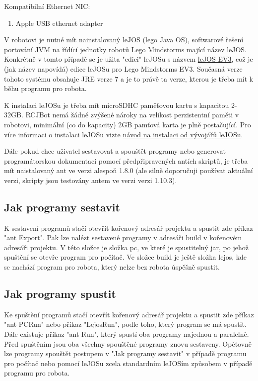\documentclass[12pt, ngerman]{article}
\begin{document}
Kompatibilní Ethernet NIC:
\begin{enumerate}[leftmargin=5mm]
\item Apple USB ethernet adapter
\end{enumerate}

V robotovi je nutné mít nainstalovaný leJOS (lego Java OS), softwarové řešení portování JVM na řídící jednotky robotů Lego Mindstorms mající název leJOS. Konkrétně v tomto případě se je užita "edici" leJOSu s názvem \href{http://www.lejos.org/ev3.php}{leJOS EV3}, což je (jak název napovídá) edice leJOSu pro Lego Mindstorms EV3. Současná verze tohoto systému obsahuje JRE verze 7 a je to právě ta verze, kterou je třeba mít k běhu programu pro robota.

K instalaci leJOSu je třeba mít microSDHC paměťovou kartu s kapacitou 2-32GB. RCJBot nemá žádné zvýšené nároky na velikost perzistentní paměti v robotovi, minimální (co do kapacity) 2GB pamťová karta je plně postačující. Pro více informaci o instalaci leJOSu vizte \href{https://sourceforge.net/p/lejos/wiki/Windows Installation/}{návod na instalaci od vývojářů leJOSu}.

Dále pokud chce uživatel sestavovat a spouštět programy nebo generovat programátorskou dokumentaci pomocí předpřipravených antích skriptů, je třeba mít naistalovaný ant ve verzi alespoň 1.8.0 (ale silně doporučuji používat aktuální verzi, skripty jsou testovány antem ve verzi verzi 1.10.3).

\subsection{Jak programy sestavit}
K sestavení programů stačí otevřít kořenový adresář projektu a spustit zde příkaz "ant Export". Pak lze nalézt sestavené programy v adresáři build v kořenovém adresáři projektu. V této složce je složka pc, ve které je spustitelný jar, po jehož spuštění se otevře program pro počítač. Ve složce build je ještě složka lejos, kde se nachází program pro robota, který nelze bez robota úspěšně spustit.

\subsection{Jak programy spustit}
Ke spuštění programů stačí otevřít kořenový adresář projektu a spustit zde příkaz "ant PCRun" nebo příkaz "LejosRun", podle toho, který program se má spustit. Dále existuje příkaz "ant Run", který spustí oba programy najednou a paralelně. Před spuštěním jsou oba všechny spouštěné programy znovu sestaveny. Opětovně lze programy spouštět postupem v "Jak programy sestavit" v případě programu pro počítač nebo pomocí leJOSu zcela standardním leJOSím způsobem v případě programu pro robota.
\end{document}
